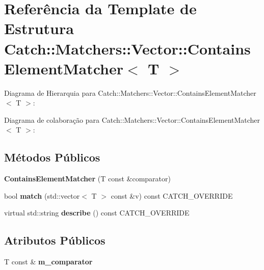 \hypertarget{structCatch_1_1Matchers_1_1Vector_1_1ContainsElementMatcher}{}\section{Referência da Template de Estrutura Catch\+:\+:Matchers\+:\+:Vector\+:\+:Contains\+Element\+Matcher$<$ T $>$}
\label{structCatch_1_1Matchers_1_1Vector_1_1ContainsElementMatcher}


Diagrama de Hierarquia para Catch\+:\+:Matchers\+:\+:Vector\+:\+:Contains\+Element\+Matcher$<$ T $>$\+:


Diagrama de colaboração para Catch\+:\+:Matchers\+:\+:Vector\+:\+:Contains\+Element\+Matcher$<$ T $>$\+:
\subsection*{Métodos Públicos}
\begin{DoxyCompactItemize}
\item 
{\bfseries Contains\+Element\+Matcher} (T const \&comparator)\hypertarget{structCatch_1_1Matchers_1_1Vector_1_1ContainsElementMatcher_a6a05740b5d3f89fac8de84ac0cff7b93}{}\label{structCatch_1_1Matchers_1_1Vector_1_1ContainsElementMatcher_a6a05740b5d3f89fac8de84ac0cff7b93}

\item 
bool {\bfseries match} (std\+::vector$<$ T $>$ const \&v) const C\+A\+T\+C\+H\+\_\+\+O\+V\+E\+R\+R\+I\+DE\hypertarget{structCatch_1_1Matchers_1_1Vector_1_1ContainsElementMatcher_a95fd99879bcfbe129898bef922c92c17}{}\label{structCatch_1_1Matchers_1_1Vector_1_1ContainsElementMatcher_a95fd99879bcfbe129898bef922c92c17}

\item 
virtual std\+::string {\bfseries describe} () const C\+A\+T\+C\+H\+\_\+\+O\+V\+E\+R\+R\+I\+DE\hypertarget{structCatch_1_1Matchers_1_1Vector_1_1ContainsElementMatcher_a5a869772714dd045816707b74b217664}{}\label{structCatch_1_1Matchers_1_1Vector_1_1ContainsElementMatcher_a5a869772714dd045816707b74b217664}

\end{DoxyCompactItemize}
\subsection*{Atributos Públicos}
\begin{DoxyCompactItemize}
\item 
T const \& {\bfseries m\+\_\+comparator}\hypertarget{structCatch_1_1Matchers_1_1Vector_1_1ContainsElementMatcher_ab7eada6c4bbce1d21b44773262f9cb23}{}\label{structCatch_1_1Matchers_1_1Vector_1_1ContainsElementMatcher_ab7eada6c4bbce1d21b44773262f9cb23}

\end{DoxyCompactItemize}


